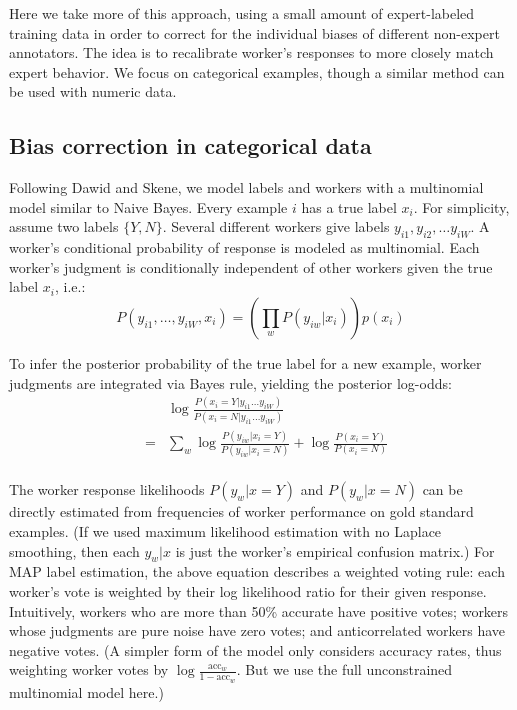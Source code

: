 \documentclass[11pt]{article}
\begin{document}

Here we take more of this approach, using a small amount of expert-labeled training data in order to correct for the individual biases of different non-expert annotators.  The idea is to recalibrate worker's responses to more closely match expert behavior.  We focus on categorical examples, though a similar method can be used with numeric data.
\vspace*{-0.1in}
\subsection{ Bias correction in categorical data }

Following Dawid and Skene, we model labels and workers with a multinomial model similar to Naive Bayes.
Every example $i$ has a true label $x_i$.  For simplicity, assume two labels $\{Y,N\}$.   Several different workers give labels $y_{i1}, y_{i2}, \ldots y_{iW}$.  A worker's conditional probability of response is modeled as multinomial.  Each worker's judgment is conditionally independent of other workers given the true label $x_i$, i.e.:
\[ P(y_{i1}, \ldots, y_{iW}, x_i) = \left( \prod_{w} P(y_{iw} | x_i) \right) p(x_i) \]

To infer the posterior probability of the true label for a new example, worker judgments are integrated via Bayes rule, yielding the posterior log-odds:
\begin{eqnarray*}
&& \log \frac{P(x_i = Y  | y_{i1} \ldots y_{iW}) }{ P(x_i=N | y_{i1} \ldots y_{iW})  }  \\
&=& \sum_w \log \frac{ P(y_{iw} | x_i = Y) }{ P(y_{iw} | x_i = N) } + \log \frac{P(x_i=Y)}{P(x_i=N)} \\
\end{eqnarray*}

The worker response likelihoods $P(y_w | x=Y)$ and $P(y_w | x=N)$ can be directly estimated from frequencies of worker performance on gold standard examples.  
(If we used maximum likelihood estimation with no Laplace smoothing, then each $y_w | x$ is just the worker's empirical confusion matrix.)  For MAP label estimation, the above equation describes a weighted voting rule: each worker's vote is weighted by their log likelihood ratio for their given response.  Intuitively, workers who are more than 50\% accurate have positive votes; workers whose judgments are pure noise have zero votes; and anticorrelated workers have negative votes.  (A simpler form of the model only considers accuracy rates, thus weighting worker votes by $\log \frac{\textrm{acc}_w}{1-\textrm{acc}_w}$.  But we use the full unconstrained multinomial model here.)
\end{document}
